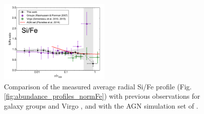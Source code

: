 \documentclass{aa}
\begin{document}
\begin{figure}[!]

                \includegraphics[width=0.48\textwidth]{fig_radial_stacked_SiFe_lit_simu.pdf}

        \caption{Comparison of the measured average radial Si/Fe profile (Fig. \ref{fig:abundance_profiles_normFe}) with previous observations for galaxy groups \citep{2007MNRAS.380.1554R} and Virgo \citep{2010MNRAS.405...91S,2015ApJ...811L..25S}, and with the AGN simulation set of \citet{2014MNRAS.438..195P}.}
\label{fig:SiFe_profiles}
\end{figure}
\end{document}
